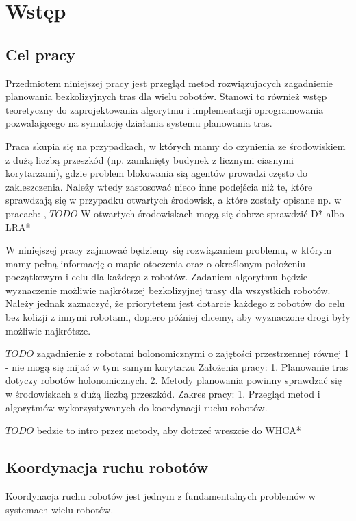\chapter{Wstęp}
\label{ch:wstep}

\section{Cel pracy}
Przedmiotem niniejszej pracy jest przegląd metod rozwiązujacych zagadnienie planowania bezkolizyjnych tras dla wielu robotów. Stanowi to również wstęp teoretyczny do zaprojektowania algorytmu i implementacji oprogramowania pozwalającego na symulację działania systemu planowania tras.

Praca skupia się na przypadkach, w których mamy do czynienia ze środowiskiem z dużą liczbą przeszkód (np. zamknięty budynek z licznymi ciasnymi korytarzami), gdzie problem blokowania sią agentów prowadzi często do zakleszczenia. Należy wtedy zastosować nieco inne podejścia niż te, które sprawdzają się w przypadku otwartych środowisk, a które zostały opisane np. w pracach: \cite{roszkowska}, \cite{siemiatkowska}
$TODO$ W otwartych środowiskach mogą się dobrze sprawdzić D* albo LRA*

W niniejszej pracy zajmować będziemy się rozwiązaniem problemu, w którym mamy pełną informację o mapie otoczenia oraz o określonym położeniu początkowym i celu dla każdego z robotów. Zadaniem algorytmu będzie wyznaczenie możliwie najkrótszej bezkolizyjnej trasy dla wszystkich robotów. Należy jednak zaznaczyć, że priorytetem jest dotarcie każdego z robotów do celu bez kolizji z innymi robotami, dopiero później chcemy, aby wyznaczone drogi były możliwie najkrótsze.

$TODO$ zagadnienie z robotami holonomicznymi o zajętości przestrzennej równej 1 - nie mogą się mijać w tym samym korytarzu
Założenia pracy:
1. Planowanie tras dotyczy robotów holonomicznych.
2. Metody planowania powinny sprawdzać się w środowiskach z dużą liczbą przeszkód.
Zakres pracy:
1. Przegląd metod i algorytmów wykorzystywanych do koordynacji ruchu robotów.

$TODO$ bedzie to intro przez metody, aby dotrzeć wreszcie do WHCA*

\section{Koordynacja ruchu robotów}
Koordynacja ruchu robotów jest jednym z fundamentalnych problemów w systemach wielu robotów. \cite{optpriorities}

